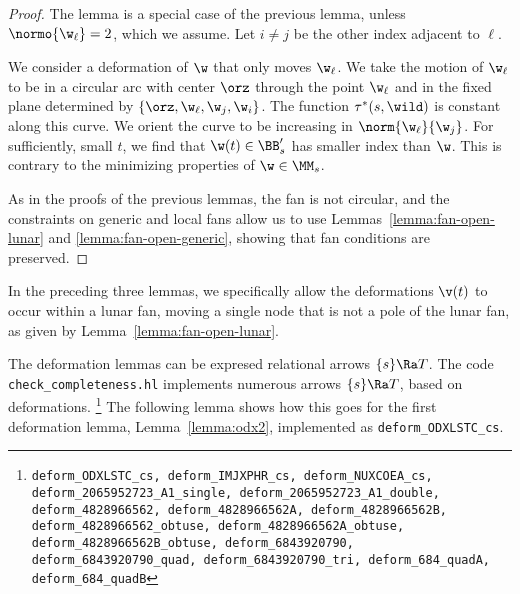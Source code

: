 \begin{proof} 
The lemma is a special
case of the previous lemma, unless $\normo{\w_\ell}=2$, which we assume.
Let $i\ne j$ be the other index adjacent to $\ell$.

We consider a deformation of $\w$ that only moves $\w_\ell$.  We take
the motion of $\w_\ell$ to be
in a circular arc with center $\orz$ through the point $\w_\ell$ and in
the fixed plane determined by $\{\orz,\w_\ell,\w_j,\w_{i}\}$.  
The function $\tau^*(s,\wild)$ is
constant along this curve.  We orient the curve to be increasing
in $\norm{\w_\ell}{\w_{j}}$.  For sufficiently, small $t$, we find that
$\w(t)\in\BB'_s$ has smaller index than $\w$.  This is contrary to the minimizing
properties of $\w\in\MM_s$.

As in the proofs of the previous lemmas, the fan is not circular, and 
the constraints on generic and local fans
allow us to use Lemmas~\ref{lemma:fan-open-lunar} and
\ref{lemma:fan-open-generic}, showing that fan conditions are preserved.
\end{proof}

In the preceding three lemmas, we specifically allow the deformations
$\v(t)$ to occur within a lunar fan, moving a single node that is not a pole
of the lunar fan, as given by Lemma~\ref{lemma:fan-open-lunar}.

The deformation lemmas can be expresed relational
arrows $\{s\}\Ra T$.  The code {\tt check\_completeness.hl} implements
numerous arrows $\{s\}\Ra T$, based on deformations.%
\footnote{\tt deform\_ODXLSTC\_cs,
deform\_IMJXPHR\_cs,
deform\_NUXCOEA\_cs,
deform\_2065952723\_A1\_single,
deform\_2065952723\_A1\_double,
deform\_4828966562,
deform\_4828966562A,
deform\_4828966562B,
deform\_4828966562\_obtuse,
deform\_4828966562A\_obtuse,
deform\_4828966562B\_obtuse,
deform\_6843920790,
deform\_6843920790\_quad,
deform\_6843920790\_tri,
deform\_684\_quadA,
deform\_684\_quadB}
The following lemma shows how this goes
for the first deformation lemma, Lemma~\ref{lemma:odx2}, implemented as
{\tt deform\_ODXLSTC\_cs}.

